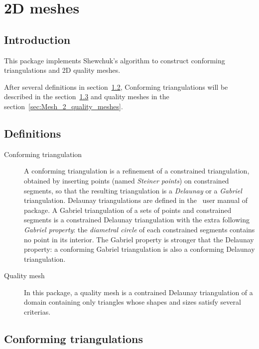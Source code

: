 \chapter{2D meshes}
\label{user_chapter_2D_Meshes}


\minitoc

\section{Introduction}
\label{sec:Mesh_2_introduction}

This package implements Shewchuk's algorithm to construct conforming
triangulations and 2D quality meshes.

After several definitions in section~\ref{sec:Mesh_2_definitions}, Conforming
triangulations will be described in the
section~\ref{sec:Mesh_2_conforming_triangulation} and quality meshes in the
section~\ref{sec:Mesh_2_quality_meshes}.


\section{Definitions}
\label{sec:Mesh_2_definitions}

\begin{description}

\item[Conforming triangulation] A conforming triangulation is a refinement
  of a constrained triangulation, obtained by inserting points (named
  \emph{Steiner points}) on constrained segments, so that the resulting
  triangulation is a \emph{Delaunay} or a \emph{Gabriel}
  triangulation. Delaunay triangulations are defined in the \cgal\ user
  manual of  package. A Gabriel triangulation of a
  sets of points and constrained segments is a constrained Delaunay
  triangulation with the extra following \emph{Gabriel property}: the
  \emph{diametral circle} of each constrained segments contains no point in
  its interior. The Gabriel property is stronger that the Delaunay property:
  a conforming Gabriel triangulation is also a conforming Delaunay
  triangulation.
\item[Quality mesh] In this package, a quality mesh is a contrained
  Delaunay triangulation of a domain containing only triangles whose shapes
  and sizes satisfy several criterias.
\end{description}


\section{Conforming triangulations}
\label{sec:Mesh_2_conforming_triangulation}

